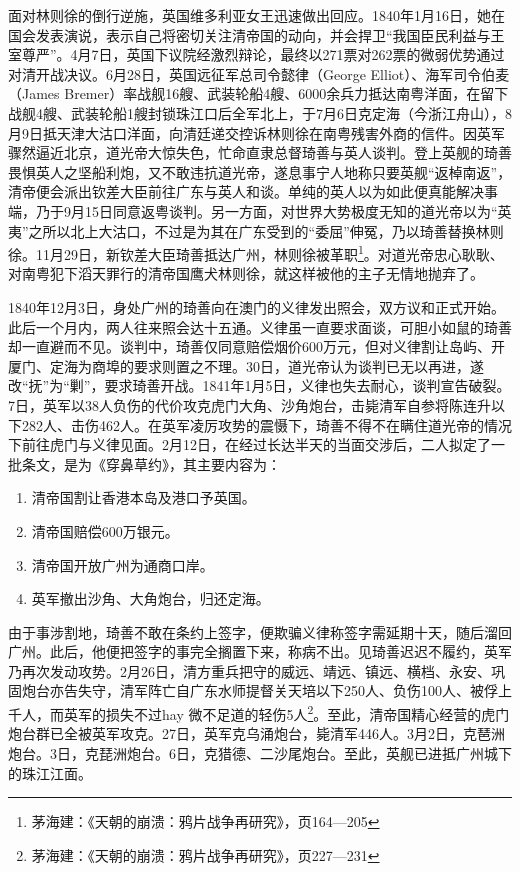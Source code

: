 面对林则徐的倒行逆施，英国维多利亚女王迅速做出回应。1840年1月16日，她在国会发表演说，表示自己将密切关注清帝国的动向，并会捍卫“我国臣民利益与王室尊严”。4月7日，英国下议院经激烈辩论，最终以271票对262票的微弱优势通过对清开战决议。6月28日，英国远征军总司令懿律（George Elliot）、海军司令伯麦（James Bremer）率战舰16艘、武装轮船4艘、6000余兵力抵达南粤洋面，在留下战舰4艘、武装轮船1艘封锁珠江口后全军北上，于7月6日克定海（今浙江舟山），8月9日抵天津大沽口洋面，向清廷递交控诉林则徐在南粤残害外商的信件。因英军骤然逼近北京，道光帝大惊失色，忙命直隶总督琦善与英人谈判。登上英舰的琦善畏惧英人之坚船利炮，又不敢违抗道光帝，遂息事宁人地称只要英舰“返棹南返”，清帝便会派出钦差大臣前往广东与英人和谈。单纯的英人以为如此便真能解决事端，乃于9月15日同意返粤谈判。另一方面，对世界大势极度无知的道光帝以为“英夷”之所以北上大沽口，不过是为其在广东受到的“委屈”伸冤，乃以琦善替换林则徐。11月29日，新钦差大臣琦善抵达广州，林则徐被革职\footnote{茅海建：《天朝的崩溃：鸦片战争再研究》，页164—205}。对道光帝忠心耿耿、对南粤犯下滔天罪行的清帝国鹰犬林则徐，就这样被他的主子无情地抛弃了。

1840年12月3日，身处广州的琦善向在澳门的义律发出照会，双方议和正式开始。此后一个月内，两人往来照会达十五通。义律虽一直要求面谈，可胆小如鼠的琦善却一直避而不见。谈判中，琦善仅同意赔偿烟价600万元，但对义律割让岛屿、开厦门、定海为商埠的要求则置之不理。30日，道光帝认为谈判已无以再进，遂改“抚”为“剿”，要求琦善开战。1841年1月5日，义律也失去耐心，谈判宣告破裂。7日，英军以38人负伤的代价攻克虎门大角、沙角炮台，击毙清军自参将陈连升以下282人、击伤462人。在英军凌厉攻势的震慑下，琦善不得不在瞒住道光帝的情况下前往虎门与义律见面。2月12日，在经过长达半天的当面交涉后，二人拟定了一批条文，是为《穿鼻草约》，其主要内容为：

\begin{enumerate}
	\item 清帝国割让香港本岛及港口予英国。
	\item 清帝国赔偿600万银元。
	\item 清帝国开放广州为通商口岸。
	\item 英军撤出沙角、大角炮台，归还定海。
\end{enumerate}

由于事涉割地，琦善不敢在条约上签字，便欺骗义律称签字需延期十天，随后溜回广州。此后，他便把签字的事完全搁置下来，称病不出。见琦善迟迟不履约，英军乃再次发动攻势。2月26日，清方重兵把守的威远、靖远、镇远、横档、永安、巩固炮台亦告失守，清军阵亡自广东水师提督关天培以下250人、负伤100人、被俘上千人，而英军的损失不过hay 微不足道的轻伤5人\footnote{茅海建：《天朝的崩溃：鸦片战争再研究》，页227—231}。至此，清帝国精心经营的虎门炮台群已全被英军攻克。27日，英军克乌涌炮台，毙清军446人。3月2日，克琶洲炮台。3日，克琵洲炮台。6日，克猎德、二沙尾炮台。至此，英舰已进抵广州城下的珠江江面。


